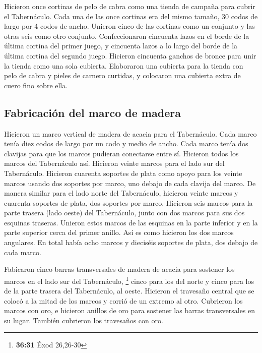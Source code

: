  Hicieron once cortinas de pelo de cabra como una tienda
de campaña para cubrir el Tabernáculo.  Cada una de las
once cortinas era del mismo tamaño, 30 codos de largo por 4 codos de
ancho.  Unieron cinco de las cortinas como un conjunto y
las otras seis como otro conjunto.  Confeccionaron
cincuenta lazos en el borde de la última cortina del primer juego, y
cincuenta lazos a lo largo del borde de la última cortina del segundo
juego.  Hicieron cincuenta ganchos de bronce para unir la
tienda como una sola cubierta.  Elaboraron una cubierta
para la tienda con pelo de cabra y pieles de carnero curtidas, y
colocaron una cubierta extra de cuero fino sobre ella.

\hypertarget{fabricaciuxf3n-del-marco-de-madera}{%
\subsection{Fabricación del marco de
madera}\label{fabricaciuxf3n-del-marco-de-madera}}

 Hicieron un marco vertical de madera de acacia para el
Tabernáculo.  Cada marco tenía diez codos de largo por un
codo y medio de ancho.  Cada marco tenía dos clavijas
para que los marcos pudieran conectarse entre sí. Hicieron todos los
marcos del Tabernáculo así.  Hicieron veinte marcos para
el lado sur del Tabernáculo.  Hicieron cuarenta soportes
de plata como apoyo para los veinte marcos usando dos soportes por
marco, uno debajo de cada clavija del marco.  De manera
similar para el lado norte del Tabernáculo, hicieron veinte marcos
 y cuarenta soportes de plata, dos soportes por marco.
 Hicieron seis marcos para la parte trasera (lado oeste)
del Tabernáculo,  junto con dos marcos para sus dos
esquinas traseras.  Unieron estos marcos de las esquinas
en la parte inferior y en la parte superior cerca del primer anillo. Así
es como hicieron los dos marcos angulares.  En total
había ocho marcos y dieciséis soportes de plata, dos debajo de cada
marco.

 Fabicaron cinco barras transversales de madera de acacia
para sostener los marcos en el lado sur del Tabernáculo, \footnote{\textbf{36:31}
  Éxod 26,26-30}  cinco para los del norte y cinco para
los de la parte trasera del Tabernáculo, al oeste. 
Hicieron el travesaño central que se colocó a la mitad de los marcos y
corrió de un extremo al otro.  Cubrieron los marcos con
oro, e hicieron anillos de oro para sostener las barras transversales en
su lugar. También cubrieron los travesaños con oro.


